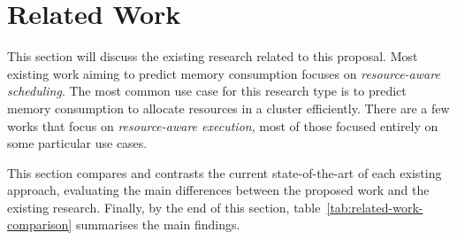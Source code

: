 \section{Related Work}
\label{sec:related-work}

This section will discuss the existing research related to this proposal.
Most existing work aiming to predict memory consumption focuses on \emph{resource-aware scheduling}.
The most common use case for this research type is to predict memory consumption to allocate resources in a cluster efficiently.
There are a few works that focus on \emph{resource-aware execution}, most of those focused entirely on some particular use cases.

This section compares and contrasts the current state-of-the-art of each existing approach, evaluating the main differences between the proposed work and the existing research.
Finally, by the end of this section, table~\ref{tab:related-work-comparison} summarises the main findings.




